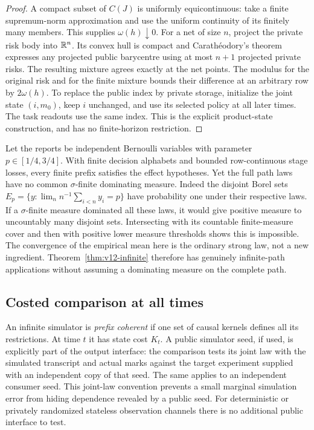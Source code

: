 \begin{proof}
A compact subset of $C(J)$ is uniformly equicontinuous: take a finite
supremum-norm approximation and use the uniform continuity of its
finitely many members. This supplies $\omega(h)\downarrow0$.
For a net of size $n$, project the private risk body into $\mathbb R^n$.
Its convex hull is compact and Carath\'eodory's theorem expresses any
projected public barycentre using at most $n+1$ projected private risks.
The resulting mixture agrees exactly at the net points. The modulus for
the original risk and for the finite mixture bounds their difference at
an arbitrary row by $2\omega(h)$. To replace the public index by private
storage, initialize the joint state $(i,m_0)$, keep $i$ unchanged, and
use its selected policy at all later times. The task readouts use the
same index. This is the explicit product-state construction, and has
no finite-horizon restriction.
\end{proof}

\begin{example}
\label{ex:v12-bernoulli}
Let the reports be independent Bernoulli variables with parameter
$p\in[1/4,3/4]$. With finite decision alphabets and bounded row-continuous
stage losses, every finite prefix satisfies the effect hypotheses.
Yet the full path laws have no common $\sigma$-finite dominating measure.
Indeed the disjoint Borel sets
$E_p=\{y:\lim_n n^{-1}\sum_{i<n}y_i=p\}$ have probability one under their
respective laws. If a $\sigma$-finite measure dominated all these laws,
it would give positive measure to uncountably many disjoint sets.
Intersecting with its countable finite-measure cover and then with positive
lower measure thresholds shows this is impossible. The convergence of the
empirical mean here is the ordinary strong law, not a new ingredient.
Theorem~\ref{thm:v12-infinite} therefore has genuinely infinite-path
applications without assuming a dominating measure on the complete path.
\end{example}

\subsection{Costed comparison at all times}
An infinite simulator is \emph{prefix coherent} if one set of causal
kernels defines all its restrictions. At time $t$ it has state cost $K_t$.
A public simulator seed, if used, is explicitly part of the output
interface: the comparison tests its joint law with the simulated
transcript and actual marks against the target experiment supplied with
an independent copy of that seed. The same applies to an independent
consumer seed. This joint-law convention prevents a small marginal
simulation error from hiding dependence revealed by a public seed.
For deterministic or privately randomized stateless observation channels
there is no additional public interface to test.

